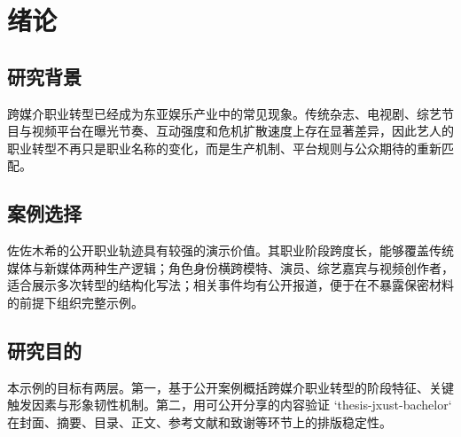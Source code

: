 \chapter{绪论}

\section{研究背景}

跨媒介职业转型已经成为东亚娱乐产业中的常见现象。传统杂志、电视剧、综艺节目与视频平台在曝光节奏、互动强度和危机扩散速度上存在显著差异，因此艺人的职业转型不再只是职业名称的变化，而是生产机制、平台规则与公众期待的重新匹配\cite{jenkins,goffman,marwick}。

\section{案例选择}

佐佐木希的公开职业轨迹具有较强的演示价值。其职业阶段跨度长，能够覆盖传统媒体与新媒体两种生产逻辑；角色身份横跨模特、演员、综艺嘉宾与视频创作者，适合展示多次转型的结构化写法；相关事件均有公开报道，便于在不暴露保密材料的前提下组织完整示例\cite{boyd,papacharissi}。

\section{研究目的}

本示例的目标有两层。第一，基于公开案例概括跨媒介职业转型的阶段特征、关键触发因素与形象韧性机制。第二，用可公开分享的内容验证 `thesis-jxust-bachelor` 在封面、摘要、目录、正文、参考文献和致谢等环节上的排版稳定性\cite{iwabuchi,azuma}。
